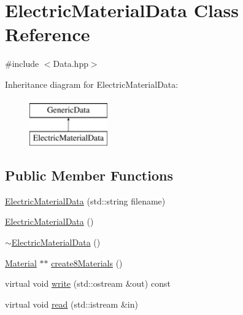 \hypertarget{class_electric_material_data}{\section{Electric\-Material\-Data Class Reference}
\label{class_electric_material_data}
}


{\ttfamily \#include $<$Data.\-hpp$>$}

Inheritance diagram for Electric\-Material\-Data\-:\begin{figure}[H]
\begin{center}
\leavevmode
\includegraphics[height=2.000000cm]{class_electric_material_data}
\end{center}
\end{figure}
\subsection*{Public Member Functions}
\begin{DoxyCompactItemize}
\item 
\hyperlink{class_electric_material_data_afd70f2557397f9ba037ccb7e29610928}{Electric\-Material\-Data} (std\-::string filename)
\item 
\hyperlink{class_electric_material_data_a8f9dcfc5028fdcc9cc0cab2cefc5d8a4}{Electric\-Material\-Data} ()
\item 
\hyperlink{class_electric_material_data_a6ca55be54566379286b4dae00a2bc9f3}{$\sim$\-Electric\-Material\-Data} ()
\item 
\hyperlink{class_material}{Material} $\ast$$\ast$ \hyperlink{class_electric_material_data_a461c256f5e82c54b68c9ca51bed0fa4a}{create8\-Materials} ()
\item 
virtual void \hyperlink{class_electric_material_data_a81244b200484e145a684c56e6f9f1252}{write} (std\-::ostream \&out) const 
\item 
virtual void \hyperlink{class_electric_material_data_ab63a0313df28615504c4a7c57adef637}{read} (std\-::istream \&in)
\end{DoxyCompactItemize}
